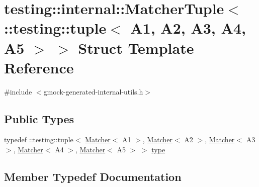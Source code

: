 \hypertarget{structtesting_1_1internal_1_1MatcherTuple_3_01_1_1testing_1_1tuple_3_01A1_00_01A2_00_01A3_00_01A4_00_01A5_01_4_01_4}{}\section{testing\+::internal\+::Matcher\+Tuple$<$ \+::testing\+::tuple$<$ A1, A2, A3, A4, A5 $>$ $>$ Struct Template Reference}
\label{structtesting_1_1internal_1_1MatcherTuple_3_01_1_1testing_1_1tuple_3_01A1_00_01A2_00_01A3_00_01A4_00_01A5_01_4_01_4}


{\ttfamily \#include $<$gmock-\/generated-\/internal-\/utils.\+h$>$}

\subsection*{Public Types}
\begin{DoxyCompactItemize}
\item 
typedef \+::testing\+::tuple$<$ \mbox{\hyperlink{classtesting_1_1Matcher}{Matcher}}$<$ A1 $>$, \mbox{\hyperlink{classtesting_1_1Matcher}{Matcher}}$<$ A2 $>$, \mbox{\hyperlink{classtesting_1_1Matcher}{Matcher}}$<$ A3 $>$, \mbox{\hyperlink{classtesting_1_1Matcher}{Matcher}}$<$ A4 $>$, \mbox{\hyperlink{classtesting_1_1Matcher}{Matcher}}$<$ A5 $>$ $>$ \mbox{\hyperlink{structtesting_1_1internal_1_1MatcherTuple_3_01_1_1testing_1_1tuple_3_01A1_00_01A2_00_01A3_00_01A4_00_01A5_01_4_01_4_a3c6f888e9aee4d15d4b5821eeff658d4}{type}}
\end{DoxyCompactItemize}


\subsection{Member Typedef Documentation}
\mbox{\label{structtesting_1_1internal_1_1MatcherTuple_3_01_1_1testing_1_1tuple_3_01A1_00_01A2_00_01A3_00_01A4_00_01A5_01_4_01_4_a3c6f888e9aee4d15d4b5821eeff658d4}} 
